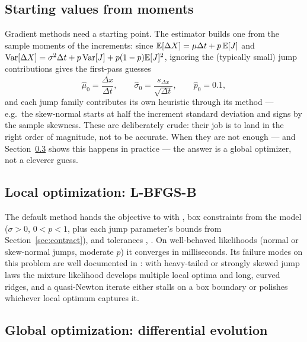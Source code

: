 \subsection{Starting values from moments}
\label{sec:initial-guess}

Gradient methods need a starting point. The estimator builds one from the
sample moments of the increments: since
$\mathbb{E}[\Delta X] = \mu \Delta t + p\,\mathbb{E}[J]$ and
$\operatorname{Var}[\Delta X] = \sigma^2 \Delta t + p \operatorname{Var}[J]
+ p(1-p)\mathbb{E}[J]^2$, ignoring the (typically small) jump contributions gives
the first-pass guesses
\begin{equation}
  \hat\mu_0 = \frac{\overline{\Delta x}}{\Delta t},
  \qquad
  \hat\sigma_0 = \frac{s_{\Delta x}}{\sqrt{\Delta t}},
  \qquad
  \hat p_0 = 0.1,
  \label{eq:initial-guess}
\end{equation}
and each jump family contributes its own heuristic through its
 method --- e.g.\ the skew-normal
starts  at half the increment standard deviation and
signs  by the sample skewness. These are deliberately
crude: their job is to land in the right order of magnitude, not to be
accurate. When they are not enough --- and Section~\ref{sec:de} shows this
happens in practice --- the answer is a global optimizer, not a cleverer
guess.

\subsection{Local optimization: L-BFGS-B}

The default method hands the objective to
 with , box
constraints from the model ($\sigma > 0$, $0 < p < 1$, plus each jump
parameter's bounds from Section~\ref{sec:contract}), and tolerances
, . On well-behaved likelihoods (normal
or skew-normal jumps, moderate $p$) it converges in milliseconds. Its
failure modes on this problem are well documented in
\citet{Ospina2009}: with heavy-tailed or strongly skewed jump laws the
mixture likelihood develops multiple local optima and long, curved ridges,
and a quasi-Newton iterate either stalls on a box boundary or polishes
whichever local optimum captures it.

\subsection{Global optimization: differential evolution}
\label{sec:de}

